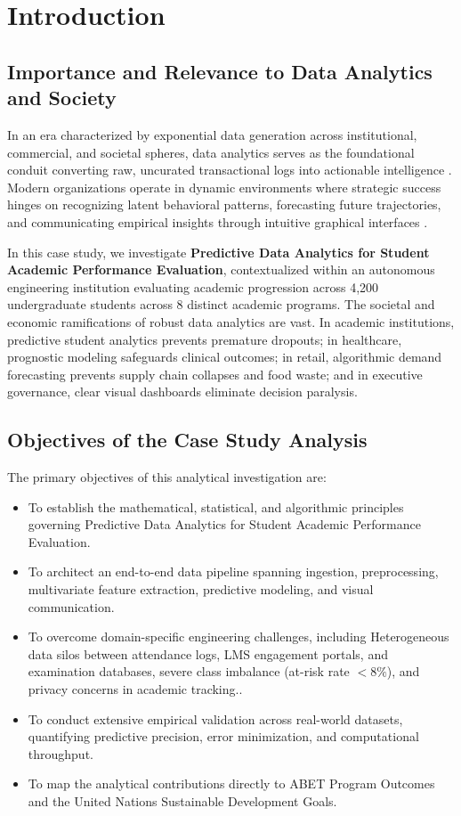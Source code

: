 \section{Introduction}

\subsection{Importance and Relevance to Data Analytics and Society}
In an era characterized by exponential data generation across institutional, commercial, and societal spheres, data analytics serves as the foundational conduit converting raw, uncurated transactional logs into actionable intelligence \cite{provost2013data}. Modern organizations operate in dynamic environments where strategic success hinges on recognizing latent behavioral patterns, forecasting future trajectories, and communicating empirical insights through intuitive graphical interfaces \cite{han2011data}.

In this case study, we investigate \textbf{Predictive Data Analytics for Student Academic Performance Evaluation}, contextualized within an autonomous engineering institution evaluating academic progression across 4,200 undergraduate students across 8 distinct academic programs. The societal and economic ramifications of robust data analytics are vast. In academic institutions, predictive student analytics prevents premature dropouts; in healthcare, prognostic modeling safeguards clinical outcomes; in retail, algorithmic demand forecasting prevents supply chain collapses and food waste; and in executive governance, clear visual dashboards eliminate decision paralysis.

\subsection{Objectives of the Case Study Analysis}
The primary objectives of this analytical investigation are:
\begin{itemize}
  \item To establish the mathematical, statistical, and algorithmic principles governing Predictive Data Analytics for Student Academic Performance Evaluation.
  \item To architect an end-to-end data pipeline spanning ingestion, preprocessing, multivariate feature extraction, predictive modeling, and visual communication.
  \item To overcome domain-specific engineering challenges, including Heterogeneous data silos between attendance logs, LMS engagement portals, and examination databases, severe class imbalance (at-risk rate $< 8\%$), and privacy concerns in academic tracking..
  \item To conduct extensive empirical validation across real-world datasets, quantifying predictive precision, error minimization, and computational throughput.
  \item To map the analytical contributions directly to ABET Program Outcomes and the United Nations Sustainable Development Goals.
\end{itemize}
